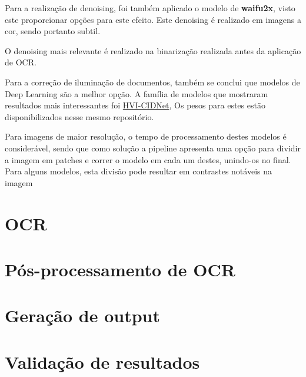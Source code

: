 Para a realização de denoising, foi também aplicado o modelo de \textbf{waifu2x}, visto este proporcionar opções para este efeito. Este denoising é realizado em imagens a cor, sendo portanto subtil.

O denoising mais relevante é realizado na binarização realizada antes da aplicação de OCR.




Para a correção de iluminação de documentos, também se conclui que modelos de Deep Learning são a melhor opção. A família de modelos que mostraram resultados mais interessantes foi \href{https://github.com/Fediory/HVI-CIDNet}{HVI-CIDNet}, Os pesos para estes estão disponibilizados nesse mesmo repositório.

Para imagens de maior resolução, o tempo de processamento destes modelos é considerável, sendo que como solução a pipeline apresenta uma opção para dividir a imagem em patches e correr o modelo em cada um destes, unindo-os no final. Para alguns modelos, esta divisão pode resultar em contrastes notáveis na imagem




\section{OCR}


\section{Pós-processamento de OCR}


\section{Geração de output}


\section{Validação de resultados}






